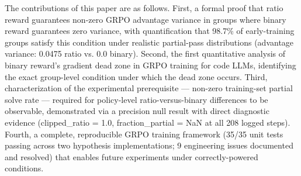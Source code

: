 The contributions of this paper are as follows. First, a formal proof that ratio reward guarantees non-zero GRPO advantage variance in groups where binary reward guarantees zero variance, with quantification that 98.7\% of early-training groups satisfy this condition under realistic partial-pass distributions (advantage variance: 0.0475 ratio vs. 0.0 binary). Second, the first quantitative analysis of binary reward's gradient dead zone in GRPO training for code LLMs, identifying the exact group-level condition under which the dead zone occurs. Third, characterization of the experimental prerequisite --- non-zero training-set partial solve rate --- required for policy-level ratio-versus-binary differences to be observable, demonstrated via a precision null result with direct diagnostic evidence (clipped\_ratio = 1.0, fraction\_partial = NaN at all 208 logged steps). Fourth, a complete, reproducible GRPO training framework (35/35 unit tests passing across two hypothesis implementations; 9 engineering issues documented and resolved) that enables future experiments under correctly-powered conditions.

